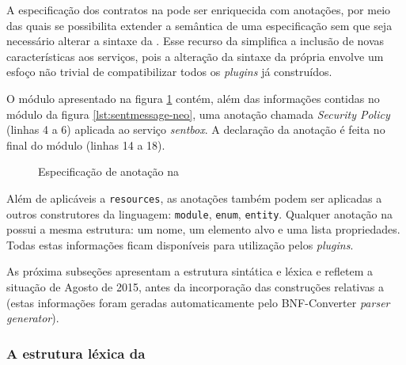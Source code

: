 A especificação dos contratos na \neoidl{} pode ser enriquecida com
anotações, por meio das quais se possibilita extender a semântica de uma
especificação sem que seja necessário alterar a sintaxe da \neoidl{}. Esse
recurso da \neoidl{} simplifica a inclusão de novas características aos
serviços, pois a alteração da sintaxe da própria \neoidl{} envolve um esfoço não
trivial de compatibilizar todos os \textit{plugins} já construídos.

O módulo apresentado na figura \ref{lst:annotationNeoIDL} contém, além das
informações contidas no módulo da figura \ref{lst:sentmessage-neo}, uma anotação chamada
\emph{Security Policy} (linhas 4 a 6) aplicada ao serviço \emph{sentbox}. A
declaração da anotação é feita no final do módulo (linhas 14 a 18).

\vspace{6mm}
 
\begin{figure}
\begin{small}

\vspace{-.5cm}
\end{small}
\caption{Especificação de anotação na \neoidl{}}
\label{lst:annotationNeoIDL}
\end{figure}

Além de aplicáveis a \texttt{resources}, as anotações também podem ser aplicadas
a outros construtores da linguagem: \texttt{module}, \texttt{enum},
\texttt{entity}. Qualquer anotação na \neoidl{} possui a mesma estrutura: um
nome, um elemento alvo e uma lista propriedades. Todas estas informações ficam
disponíveis para utilização pelos \textit{plugins}.

As próxima subseções apresentam a estrutura sintática e léxica \neoidl{} e
refletem a situação de Agosto de 2015, antes da incorporação das construções
relativas a \designbycontract{} (estas informações foram geradas 
automaticamente pelo BNF-Converter \cite{forsberg-bnfc:2004} \textit{parser
generator}). 

\subsubsection{A estrutura léxica da \neoidl{}}\label{sub:lexico}


